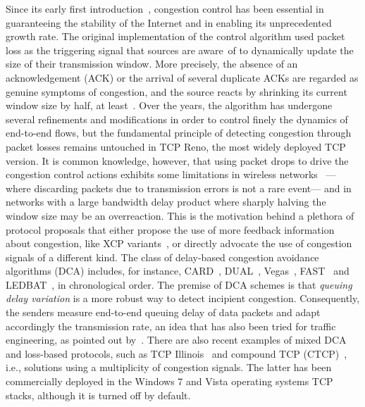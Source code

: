 \documentclass[english,times]{ettauth}
\begin{document}
Since its early first introduction~\cite{Jacobson96,rfc2581}, congestion
control has been essential in guaranteeing the stability of the Internet and
in enabling its unprecedented growth rate. The original implementation of the
control algorithm used packet loss as the triggering signal that sources are
aware~of to dynamically update the size of their transmission window. More
precisely, the absence of an acknowledgement (ACK) or the arrival of several
duplicate ACKs are regarded as genuine symptoms of congestion, and the source
reacts by shrinking its current window size by half, at least~\cite{rfc5681}.
Over the years, the algorithm has undergone several refinements and
modifications in order to control finely the dynamics of end-to-end flows, but
the fundamental principle of detecting congestion through packet losses
remains untouched in TCP Reno, the most widely deployed TCP version. It is
common knowledge, however, that using packet drops to drive the congestion
control actions exhibits some limitations in wireless
networks~\cite{lassila08:_perfor_tcp_low_wirel_links_delay_spikes} ---where
discarding packets due to transmission errors is not a rare event--- and in
networks with a large bandwidth  delay product where sharply halving
the window size may be an overreaction. This is the motivation behind a
plethora of protocol proposals that either propose the use of more feedback
information about congestion, like XCP
variants~\cite{Katabi02,xia05:_one_more_bit_enoug,wu09:_effic_fair_explic_conges_contr,almeida10:_explic_conges_contr_based_probab_markin},
or directly advocate the use of congestion signals of a different kind. The
class of delay-based congestion avoidance algorithms (DCA) includes, for
instance, CARD~\cite{Jain89}, DUAL~\cite{Wang92}, Vegas~\cite{Brakmo94},
FAST~\cite{Wei06} and LEDBAT~\cite{Shalunov10}, in chronological order. The
premise of DCA schemes is that \emph{queuing delay variation} is a more robust
way to detect incipient congestion. Consequently, the senders measure
end-to-end queuing delay of data packets and adapt accordingly the
transmission rate, an idea that has also been tried for traffic engineering,
as pointed out by~\cite{alparslan11:_tcp_flow_aware_adapt_path}. There are
also recent examples of mixed DCA and loss-based protocols, such as TCP
Illinois~\cite{Liu06} and compound TCP (CTCP)~\cite{Tan06}, i.e., solutions
using a multiplicity of congestion signals. The latter has been commercially
deployed in the Windows 7 and Vista operating systems TCP stacks, although it
is turned off by default.
\end{document}
